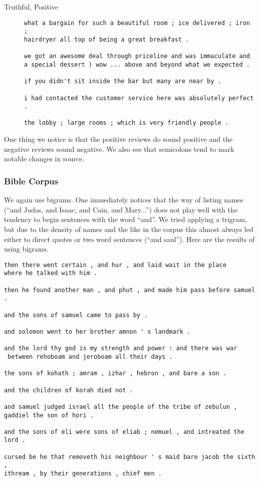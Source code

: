 \documentclass[12pt]{article}
\begin{document}
\begin{description}
\item[Truthful, Positive]
\begin{verbatim}
what a bargain for such a beautiful room ; ice delivered ; iron ; 
hairdryer all top of being a great breakfast .

we got an awesome deal through priceline and was immaculate and 
a special dessert ) wow ... above and beyond what we expected .

if you didn't sit inside the bar but many are near by .

i had contacted the customer service here was absolutely perfect .

the lobby ; large rooms ; which is very friendly people .
\end{verbatim}
\end{description}

One thing we notice is that the positive reviews do sound positive and the negative reviews sound negative. We also see that semicolons tend to mark notable changes in source.

\subsubsection{Bible Corpus}
We again use bigrams. One immediately notices that the way of listing names (``and Judas, and Isaac, and Cain, and Mary...'') does not play well with the tendency to begin sentences with the word ``and''. We tried applying a trigram, but due to the density of names and the like in the corpus this almost always led either to direct quotes or two word sentences (``and saul''). Here are the results of using bigrams.

\begin{verbatim}
then there went certain , and hur , and laid wait in the place
where he talked with him .

then he found another man , and phut , and made him pass before samuel .

and the sons of samuel came to pass by .

and solomon went to her brother amnon ' s landmark .

and the lord thy god is my strength and power : and there was war
 between rehoboam and jeroboam all their days .

the sons of kohath ; amram , izhar , hebron , and bare a son .

and the children of korah died not .

and samuel judged israel all the people of the tribe of zebulun ,
gaddiel the son of hori .

and the sons of eli were sons of eliab ; nemuel , and intreated the lord .

cursed be he that removeth his neighbour ' s maid bare jacob the sixth ,
ithream , by their generations , chief men .
\end{verbatim}
\end{document}
